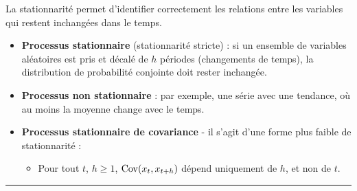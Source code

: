   \begin{f}[Stationnarité]

La stationnarité permet d'identifier correctement les relations entre les variables qui restent inchangées dans le temps.

\begin{itemize}[leftmargin=*]
	\item \textbf{Processus stationnaire} (stationnarité stricte) : si un ensemble de variables aléatoires est pris et décalé de \(h\) périodes (changements de temps), la distribution de probabilité conjointe doit rester inchangée.
	\item \textbf{Processus non stationnaire} : par exemple, une série avec une tendance, où au moins la moyenne change avec le temps.
	\item \textbf{Processus stationnaire de covariance} - il s'agit d'une forme plus faible de stationnarité :
	
	\begin{itemize}[leftmargin=*]
		
		\item Pour tout \(t\), \(h \geq 1\), \(\mathrm{Cov}(x_{t}, x_{t + h})\) dépend uniquement de \(h\), et non de \(t\).
	\end{itemize}
\end{itemize}

\end{f}  \hrule

